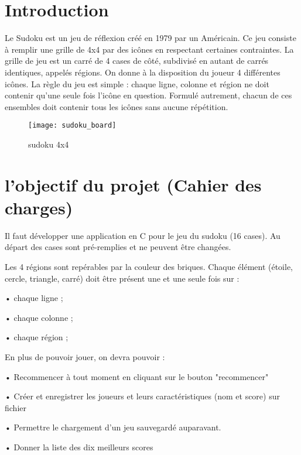 \documentclass{article}
\begin{document}
\date{Janvier 2019}
\maketitle


\section{Introduction}
Le Sudoku est un jeu de réflexion créé en 1979 par un Américain. Ce jeu consiste à remplir une grille de 4x4 par des icônes en respectant certaines contraintes.
La grille de jeu est un carré de 4 cases de côté, subdivisé en autant de carrés identiques, appelés régions. On donne à la disposition du joueur 4 différentes icônes.
La règle du jeu est simple : chaque ligne, colonne et région ne doit contenir qu'une seule fois l’icône en question. Formulé autrement, chacun de ces ensembles doit contenir tous les icônes sans aucune répétition.

\begin{figure}[h!]
\centering
\texttt{[image: sudoku\_board]}
\caption{sudoku 4x4}
\label{fig:sudoku_board}
\end{figure}

\section{l'objectif du projet (Cahier des charges)}

Il faut développer une application en C pour le jeu du sudoku
(16 cases). Au départ des cases sont pré-remplies et ne peuvent être changées.

Les 4 régions sont repérables par la couleur des briques. Chaque élément (étoile, cercle, triangle, carré) doit être présent une et une seule fois sur :

	• chaque ligne ;
    
	• chaque colonne ;
    
	• chaque région ;
    

\noindent En plus de pouvoir jouer, on devra pouvoir :

	• Recommencer à tout moment en cliquant sur le bouton "recommencer"
    
    • Créer et enregistrer les joueurs et leurs caractéristiques (nom et score) sur 		fichier
    
	• Permettre le chargement d’un jeu sauvegardé auparavant.
    
	• Donner la liste des dix meilleurs scores
    
\end{document}
